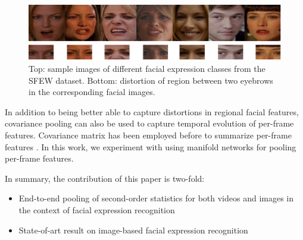 \documentclass[10pt,twocolumn,letterpaper]{article}
\begin{document}
	\begin{figure}
		\begin{center}
				\includegraphics[width=.95\linewidth,keepaspectratio]{res/sfew2}
				
					\includegraphics[width=.95\linewidth,keepaspectratio]{res/sfew3}

				
		\end{center}
		\caption{Top: sample images of different facial expression classes from the SFEW dataset. Bottom: distortion of region between two eyebrows in the corresponding facial images.}
		\label{fig:sfew}
	\end{figure}
	


In addition to being better able to capture distortions in regional facial features, covariance pooling can also be used to capture temporal evolution of per-frame features. Covariance matrix has been employed before to summarize per-frame features \cite{emoti14}. In this work, we experiment with using manifold networks for pooling per-frame features.

In summary, the contribution of this paper is two-fold:
\begin{itemize}
    \item End-to-end pooling of second-order statistics for both videos and images in the context of facial expression recognition
    \item State-of-art result on image-based facial expression recognition

\end{itemize}

\end{document}
